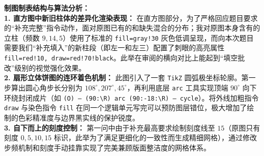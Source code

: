 \vspace{0.4cm}
\begin{center}
\end{center}

\vspace{0.6cm}

{\small\color{blue!70!black}
\textbf{制图制表结构与算法分析：}\\
\textbf{1. 直方图中新旧柱体的差异化渲染表现：} 在直方图部分，为了严格回应题目要求的“补充完整”指令动作，面对原图已有的和缺失混合的分布；我对原图本身含有的立柱（频数 $9, 14, 5$）使用了标准的 \texttt{fill=gray!30} 灰色低调呈现，而向本次题目需要我们“补充填入”的新柱段（即左一和左三）配置了刺眼的高亮属性 \texttt{fill=red!10, draw=red!70!black}。此举在审阅的横向对比上能起到“填空批改”级别的视觉强化效果。\\
\textbf{2. 扇形立体饼图的连环着色机制：} 此图引入了一套 \texttt{TikZ} 圆弧极坐标轮廓。第一步算出圆心角步长分别为 $108^\circ, 207^\circ, 45^\circ$，再利用底层 \texttt{arc} 工具实现顶端 $90^\circ$ 向下环绕封闭成片（如 \texttt{(O) -- (90:\textbackslash R) arc (90:-18:\textbackslash R) -- cycle}）。将外线加粗指令 \texttt{draw} 与染色指令 \texttt{fill} 在同一个逻辑单元写完可以预防图层错位，极大增加了绘制的色彩精准度与边界黑实线的保护锐度。\\
\textbf{3. 自下而上的刻度控制：} 第一问中由于补充最高要求绘制刻度线至 $15$（原图只有刻度 $0,5,10,15$ 标识，此举为了满足更细化的一致性而生成精细网格），通过修改步频机制和刻度手动挂靠实现了完美兼顾版面整洁度的网格体系。
}

